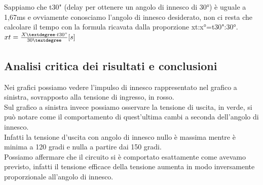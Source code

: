 \documentclass[12pt]{article}
\begin{document}
Sappiamo che t30" (delay per ottenere un angolo di innesco di 30°) è uguale a 1,67ms  e ovviamente
conosciamo l'angolo di innesco desiderato, non ci resta che calcolare il tempo con la formula ricavata
dalla proporzione xt:x°=t30":30°.\\
$xt=\frac{X°\cdot t30"}{30°} [s]$
\subsection{Analisi critica dei risultati e conclusioni}
Nei grafici possiamo vedere l'impulso di innesco rappresentato nel grafico a sinistra, sovrapposto alla tensione 
di ingresso, in rosso.\\
Sul grafico a sinistra invece possiamo osservare la tensione di uscita, in verde, si può notare come il 
comportamento di quest'ultima cambi a seconda dell'angolo di innesco.\\
Infatti la tensione d'uscita con angolo di innesco nullo è massima mentre è minima a 120 gradi e nulla a partire
dai 150 gradi.\\
Possiamo affermare che il circuito si è comportato esattamente come avevamo previsto, infatti il tensione efficace
della tensione aumenta in modo inversamente proporzionale all'angolo di innesco.\\
\end{document}

